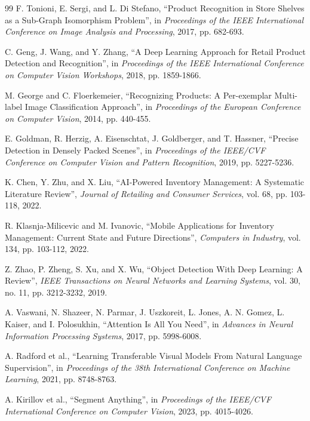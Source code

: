 \documentclass[12pt,a4paper]{report}
\begin{document}
\begin{thebibliography}{99}
    F. Tonioni, E. Sergi, and L. Di Stefano, ``Product Recognition in Store Shelves as a Sub-Graph Isomorphism Problem'', in \textit{Proceedings of the IEEE International Conference on Image Analysis and Processing}, 2017, pp. 682-693.
    
    C. Geng, J. Wang, and Y. Zhang, ``A Deep Learning Approach for Retail Product Detection and Recognition'', in \textit{Proceedings of the IEEE International Conference on Computer Vision Workshops}, 2018, pp. 1859-1866.
    
    M. George and C. Floerkemeier, ``Recognizing Products: A Per-exemplar Multi-label Image Classification Approach'', in \textit{Proceedings of the European Conference on Computer Vision}, 2014, pp. 440-455.
    
    E. Goldman, R. Herzig, A. Eisenschtat, J. Goldberger, and T. Hassner, ``Precise Detection in Densely Packed Scenes'', in \textit{Proceedings of the IEEE/CVF Conference on Computer Vision and Pattern Recognition}, 2019, pp. 5227-5236.
    
    K. Chen, Y. Zhu, and X. Liu, ``AI-Powered Inventory Management: A Systematic Literature Review'', \textit{Journal of Retailing and Consumer Services}, vol. 68, pp. 103-118, 2022.
    
    R. Klasnja-Milicevic and M. Ivanovic, ``Mobile Applications for Inventory Management: Current State and Future Directions'', \textit{Computers in Industry}, vol. 134, pp. 103-112, 2022.
    
    Z. Zhao, P. Zheng, S. Xu, and X. Wu, ``Object Detection With Deep Learning: A Review'', \textit{IEEE Transactions on Neural Networks and Learning Systems}, vol. 30, no. 11, pp. 3212-3232, 2019.
    
    A. Vaswani, N. Shazeer, N. Parmar, J. Uszkoreit, L. Jones, A. N. Gomez, L. Kaiser, and I. Polosukhin, ``Attention Is All You Need'', in \textit{Advances in Neural Information Processing Systems}, 2017, pp. 5998-6008.

    A. Radford et al., ``Learning Transferable Visual Models From Natural Language Supervision'', in \textit{Proceedings of the 38th International Conference on Machine Learning}, 2021, pp. 8748-8763.

    A. Kirillov et al., ``Segment Anything'', in \textit{Proceedings of the IEEE/CVF International Conference on Computer Vision}, 2023, pp. 4015-4026.


\end{thebibliography}
\end{document}
